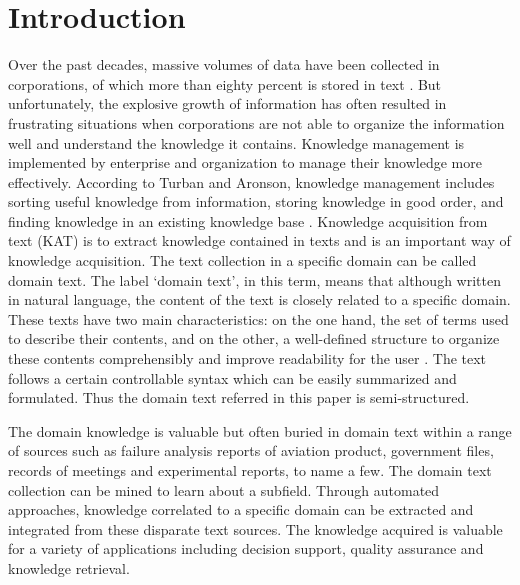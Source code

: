 \documentclass{elsarticle}
\begin{document}
\section{Introduction}
\label{sec:introduction}

Over the past decades, massive volumes of data have been collected in
corporations, of which more than eighty percent is stored in
text \cite{Mitchell2003}. But unfortunately, the explosive growth of
information has often resulted in frustrating situations when
corporations are not able to organize the information well and
understand the knowledge it contains. Knowledge management is
implemented by enterprise and organization to manage their knowledge
more effectively. According to Turban and Aronson, knowledge
management includes sorting useful knowledge from information, storing
knowledge in good order, and finding knowledge in an existing
knowledge base \cite{turban2001dss}. Knowledge acquisition from text
(KAT) is to extract knowledge contained in texts and is an important
way of knowledge acquisition. The text collection in a specific domain
can be called domain text. The label ‘domain text’, in this term,
means that although written in natural language, the content of the
text is closely related to a specific domain. These texts have two
main characteristics: on the one hand, the set of terms used to
describe their contents, and on the other, a well-defined structure to
organize these contents comprehensibly and improve readability for the
user \cite{Campos2004}. The text follows a certain controllable syntax
which can be easily summarized and formulated. Thus the domain text
referred in this paper is semi-structured. 

The domain knowledge is valuable but often buried in domain text within a range of sources such as failure analysis reports of aviation product, government files, records of meetings and experimental reports, to name a few. The domain text collection can be mined to learn about a subfield. Through automated approaches, knowledge correlated to a specific domain can be extracted and integrated from these disparate text sources. The knowledge acquired is valuable for a variety of applications including decision support, quality assurance and knowledge retrieval.
\end{document}
